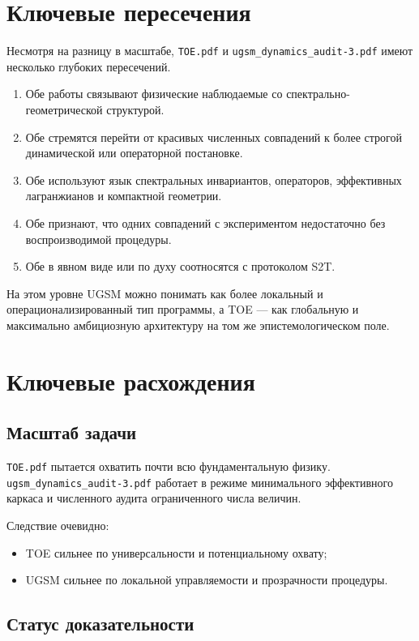 \documentclass[12pt,a4paper]{article}
\begin{document}
\section{Ключевые пересечения}

Несмотря на разницу в масштабе, \texttt{TOE.pdf} и \texttt{ugsm\_dynamics\_audit-3.pdf} имеют несколько глубоких пересечений.

\begin{enumerate}
    \item Обе работы связывают физические наблюдаемые со спектрально-геометрической структурой.
    \item Обе стремятся перейти от красивых численных совпадений к более строгой динамической или операторной постановке.
    \item Обе используют язык спектральных инвариантов, операторов, эффективных лагранжианов и компактной геометрии.
    \item Обе признают, что одних совпадений с экспериментом недостаточно без воспроизводимой процедуры.
    \item Обе в явном виде или по духу соотносятся с протоколом S2T.
\end{enumerate}

На этом уровне UGSM можно понимать как более локальный и операционализированный тип программы, а TOE --- как глобальную и максимально амбициозную архитектуру на том же эпистемологическом поле.

\section{Ключевые расхождения}

\subsection{Масштаб задачи}

\texttt{TOE.pdf} пытается охватить почти всю фундаментальную физику. \texttt{ugsm\_dynamics\_audit-3.pdf} работает в режиме минимального эффективного каркаса и численного аудита ограниченного числа величин.

Следствие очевидно:
\begin{itemize}
    \item TOE сильнее по универсальности и потенциальному охвату;
    \item UGSM сильнее по локальной управляемости и прозрачности процедуры.
\end{itemize}

\subsection{Статус доказательности}
\end{document}
